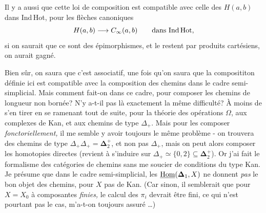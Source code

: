 \clearpage
{}

Il y a aussi que cette loi de composition est compatible avec celle des $H(a,b)$ dans Ind\,Hot, pour les flèches canoniques
\[ H(a,b)\longrightarrow C_\infty(a,b) \qquad \text{dans Ind\,Hot}, \]
si on saurait que ce sont des épimorphismes, et le restent par produits cartésiens, on aurait gagné.

Bien sûr, on saura que c'est associatif, une fois qu'on saura que la composititon définie ici est compatible avec la composition des chemins dans le cadre semi-simplicial. Mais comment fait-on dans ce cadre, pour composer les chemins de longueur non bornée? N'y a-t-il pas là exactement la même difficulté? À moins de s'en %
tirer en se ramenant tout de suite, pour la théorie des opérations $\Omega$, aux complexes de Kan, et aux chemins de type $\Delta_+$. Mais pour les composer \textit{fonctoriellement,} il me semble y avoir toujours le même problème - on trouvera des chemins de type $\Delta_+\Delta_+ = \boldsymbol{\Delta}_2^+$, et non pas $\Delta_+$, mais on peut alors composer les homotopies directes (revient à s'induire sur $\Delta_+\simeq\{0,2\}\subseteq\boldsymbol{\Delta}_2^+$). Or j'ai fait le formalisme des catégories de chemins sans me soucier de conditions du type Kan. Je présume que dans le cadre semi-simplicial, les $\underline{\mathrm{Hom}}(\boldsymbol{\Delta}_1,X)$ ne donnent \textit{pas} le bon objet des chemins, pour $X$ pas de Kan. (Car sinon, il semblerait que pour $X=X_0$ à composantes \textit{finies,} le calcul des $\pi_i$ devrait être fini, ce qui n'est pourtant pas le cas, m'a-t-on toujours assuré \dots)

